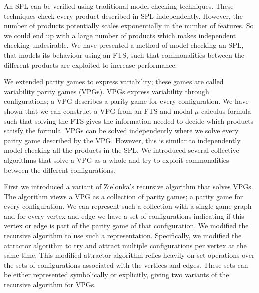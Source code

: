 An SPL can be verified using traditional model-checking techniques. These techniques check every product described in SPL independently. However, the number of products potentially scales exponentially in the number of features. So we could end up with a large number of products which makes independent checking undesirable. We have presented a method of model-checking an SPL, that models its behaviour using an FTS, such that commonalities between the different products are exploited to increase performance.

We extended parity games to express variability; these games are called variability parity games (VPGs). VPGs express variability through configurations; a VPG describes a parity game for every configuration. We have shown that we can construct a VPG from an FTS and modal $\mu$-calculus formula such that solving the FTS gives the information needed to decide which products satisfy the formula. VPGs can be solved independently where we solve every parity game described by the VPG. However, this is similar to independently model-checking all the products in the SPL. We introduced several collective algorithms that solve a VPG as a whole and try to exploit commonalities between the different configurations.

First we introduced a variant of Zielonka's recursive algorithm that solves VPGs. The algorithm views a VPG as a collection of parity games; a parity game for every configuration. We can represent such a collection with a single game graph and for every vertex and edge we have a set of configurations indicating if this vertex or edge is part of the parity game of that configuration. We modified the recursive algorithm to use such a representation. Specifically, we modified the attractor algorithm to try and attract multiple configurations per vertex at the same time. This modified attractor algorithm relies heavily on set operations over the sets of configurations associated with the vertices and edges. These sets can be either represented symbolically or explicitly, giving two variants of the recursive algorithm for VPGs.

